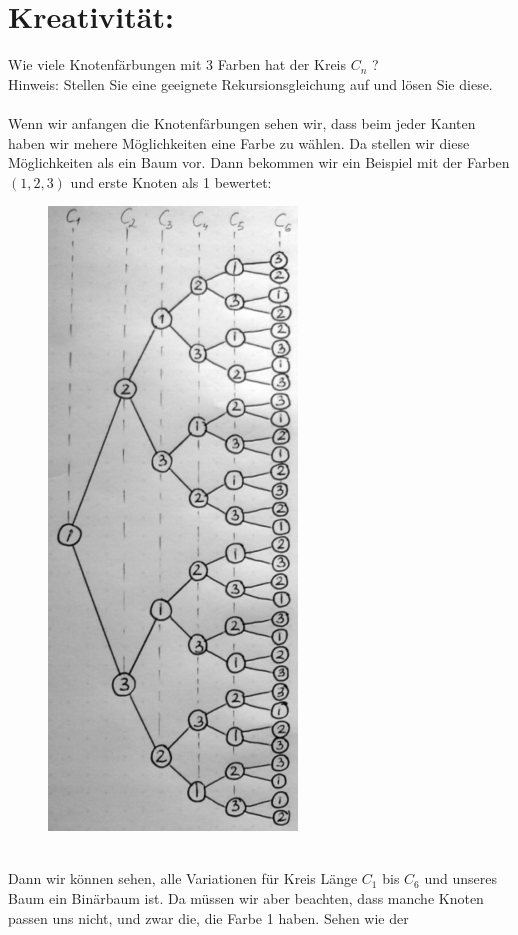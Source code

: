     \section*{Kreativität:} Wie viele Knotenfärbungen mit 3 Farben hat der Kreis $C_n$ ?\\
        Hinweis: Stellen Sie eine geeignete Rekursionsgleichung auf und lösen Sie diese.\\\\
        Wenn wir anfangen die Knotenfärbungen sehen wir, dass beim jeder Kanten haben wir mehere 
        Möglichkeiten eine Farbe zu wählen. Da stellen wir diese Möglichkeiten als ein Baum vor. 
        Dann bekommen wir ein Beispiel mit der Farben $(1,2,3)$ und erste Knoten als 1 bewertet:
        \begin{figure}
            \includegraphics[width=1\linewidth]{baum_kreativ}
        \end{figure}\\
        Dann wir können sehen, alle Variationen für Kreis Länge $C_1$ bis $C_6$ und unseres Baum ein 
        Binärbaum ist. Da müssen wir aber beachten, dass manche Knoten passen uns nicht, und zwar die, 
        die Farbe 1 haben. Sehen wie der 
